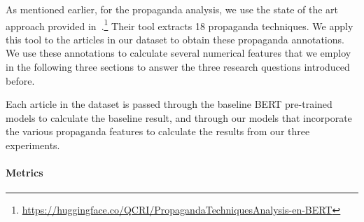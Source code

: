 As mentioned earlier, for the propaganda analysis, we use the state of the art approach provided in~\citet{da2019fine}.\footnote{\url{https://huggingface.co/QCRI/PropagandaTechniquesAnalysis-en-BERT}} Their tool extracts 18 propaganda techniques. We apply this tool to the articles in our dataset to obtain these propaganda annotations. 
We use these annotations to calculate several numerical features that we employ in the following three sections to answer the three research questions introduced before.



Each article in the dataset is passed through the baseline BERT pre-trained models to calculate the baseline result, and through our models that incorporate the various propaganda features to calculate the results from our three experiments. %

\paragraph{Metrics}

